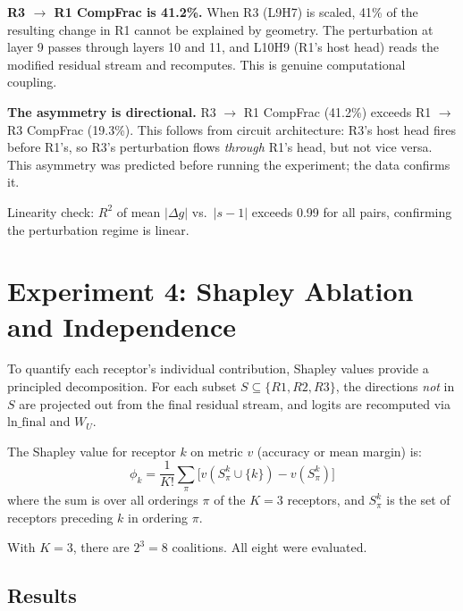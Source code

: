 \documentclass[11pt,a4paper]{article}
\begin{document}
\textbf{R3 $\to$ R1 CompFrac is 41.2\%.} When R3 (L9H7) is scaled, 41\% of the resulting change in R1 cannot be explained by geometry. The perturbation at layer 9 passes through layers 10 and 11, and L10H9 (R1's host head) reads the modified residual stream and recomputes. This is genuine computational coupling.

\textbf{The asymmetry is directional.} R3 $\to$ R1 CompFrac (41.2\%) exceeds R1 $\to$ R3 CompFrac (19.3\%). This follows from circuit architecture: R3's host head fires before R1's, so R3's perturbation flows \emph{through} R1's head, but not vice versa. This asymmetry was predicted before running the experiment; the data confirms it.

Linearity check: $R^2$ of mean $|\Delta g|$ vs.\ $|s-1|$ exceeds 0.99 for all pairs, confirming the perturbation regime is linear.


\section{Experiment 4: Shapley Ablation and Independence}
\label{sec:exp4}

To quantify each receptor's individual contribution, Shapley values provide a principled decomposition. For each subset $S \subseteq \{R1, R2, R3\}$, the directions \emph{not} in $S$ are projected out from the final residual stream, and logits are recomputed via $\text{ln\_final}$ and $W_U$.

The Shapley value for receptor $k$ on metric $v$ (accuracy or mean margin) is:
\begin{equation}
\phi_k = \frac{1}{K!} \sum_{\pi} \big[v(S_\pi^k \cup \{k\}) - v(S_\pi^k)\big]
\end{equation}
where the sum is over all orderings $\pi$ of the $K=3$ receptors, and $S_\pi^k$ is the set of receptors preceding $k$ in ordering $\pi$.

With $K=3$, there are $2^3 = 8$ coalitions. All eight were evaluated.

\subsection{Results}
\end{document}
